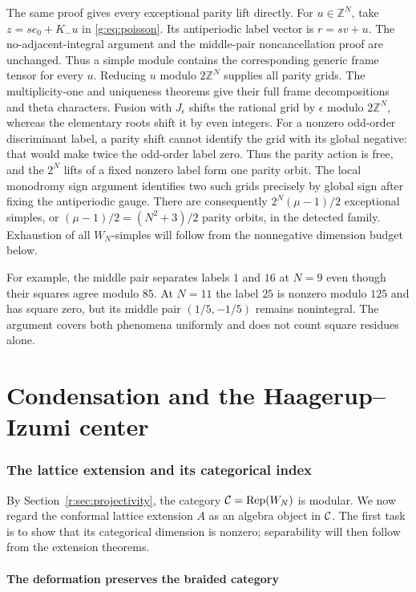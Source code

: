 \documentclass[11pt,a4paper]{article}
\numberwithin{equation}{section}
\theoremstyle{definition}\newtheorem{definition}[theorem]{Definition}
\theoremstyle{remark}\newtheorem{remark}[theorem]{Remark}
\newcommand{\Rep}{\operatorname{Rep}}\newcommand{\Ext}{\operatorname{Ext}}
\begin{document}
The same proof gives every exceptional parity lift directly. For
$u\in\mathbb Z^N$, take $z=se_0+K_-u$ in \eqref{g:eq:poisson}.
Its antiperiodic label vector is $r=sv+u$. The no-adjacent-integral
argument and the middle-pair noncancellation proof are unchanged.
Thus a simple module contains the corresponding generic frame tensor
for every $u$. Reducing $u$ modulo $2\mathbb Z^N$ supplies all parity
grids. The multiplicity-one and uniqueness theorems give their full frame
decompositions and theta characters. Fusion with $J_\epsilon$ shifts
the rational grid by $\epsilon$ modulo $2\mathbb Z^N$, whereas
the elementary roots shift it by even integers. For a nonzero
odd-order discriminant label, a parity shift cannot identify the
grid with its global negative: that would make twice the odd-order
label zero. Thus the parity action is free, and the $2^N$ lifts
of a fixed nonzero label form one parity orbit. The local monodromy sign
argument identifies two such grids precisely by global sign after
fixing the antiperiodic gauge. There are consequently
$2^N(\mu-1)/2$ exceptional simples, or $(\mu-1)/2=(N^2+3)/2$
parity orbits, in the detected family. Exhaustion of all $W_N$-simples
will follow from the nonnegative dimension budget below.

For example, the middle pair separates labels $1$ and $16$ at $N=9$
even though their squares agree modulo $85$. At $N=11$ the label
$25$ is nonzero modulo $125$ and has square zero, but its middle
pair $(1/5,-1/5)$ remains nonintegral. The argument covers both
phenomena uniformly and does not count square residues alone.

\part{Condensation and the Haagerup--Izumi center}

\section{The lattice extension and its categorical index}
\label{r:sec:extension}

By Section~\ref{r:sec:projectivity}, the category
$\Cat=\Rep(W_N)$ is modular. We now regard the conformal lattice
extension $A$ as an algebra object in $\mathcal C$. The first task is to
show that its categorical dimension is nonzero; separability will
then follow from the extension theorems.

\subsection{The deformation preserves the braided category}
\end{document}
